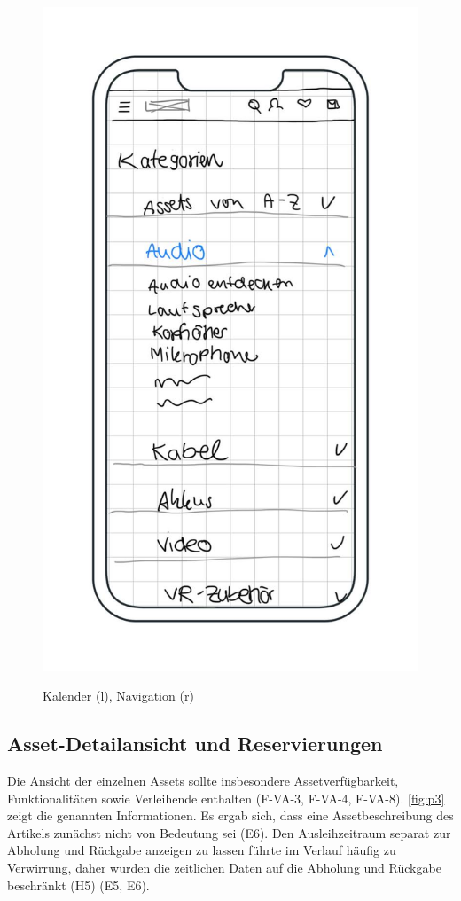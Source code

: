 \begin{figure}[h]
    \includegraphics[scale=0.4]{Bilder/Mockups/Kategorien.jpg}
    \label{fig:kalender}
\caption[Kalenderkomponente]{Kalender (l), Navigation (r)}
\end{figure}

\subsection{Asset-Detailansicht und Reservierungen}
Die Ansicht der einzelnen Assets sollte insbesondere Assetverfügbarkeit, Funktionalitäten sowie
Verleihende enthalten (F-VA-3, F-VA-4, F-VA-8). \ref{fig:p3} zeigt die genannten Informationen. Es
ergab sich, dass eine Assetbeschreibung des Artikels zunächst nicht von Bedeutung sei (E6). Den
Ausleihzeitraum separat zur Abholung und Rückgabe anzeigen zu lassen führte im Verlauf häufig zu
Verwirrung, daher wurden die zeitlichen Daten auf die Abholung und Rückgabe beschränkt (H5) (E5, E6).

